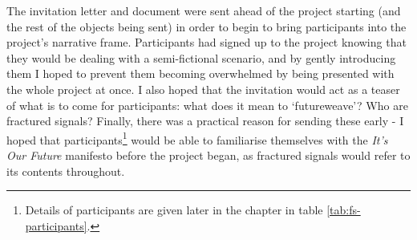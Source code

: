 The invitation letter and document were sent ahead of the project starting (and the rest of the objects being sent) in order to begin to bring participants into the project's narrative frame. Participants had signed up to the project knowing that they would be dealing with a semi-fictional scenario, and by gently introducing them I hoped to prevent them becoming overwhelmed by being presented with the whole project at once. I also hoped that the invitation would act as a teaser of what is to come for participants: what does it mean to `futureweave'? Who are fractured signals? Finally, there was a practical reason for sending these early - I hoped that participants\footnote{Details of participants are given later in the chapter in table \ref{tab:fs-participants}.} would be able to familiarise themselves with the \emph{It's Our Future} manifesto before the project began, as fractured signals would refer to its contents throughout. 

